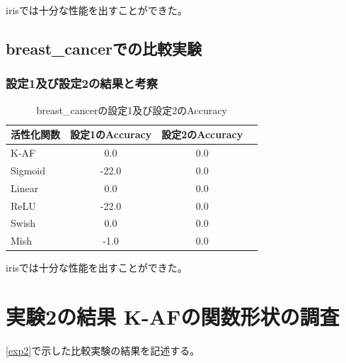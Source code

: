irisでは十分な性能を出すことができた。



\subsection{breast\_cancerでの比較実験}
\label{ev:breastcancer}

\subsubsection{設定1及び設定2の結果と考察}


\begin{table}[htbp]
    \begin{center}
        \caption{breast\_cancerの設定1及び設定2のAccuracy}
        \vspace{2mm} 
        \begin{tabular}{l*{2}{c}r}
            活性化関数              & 設定1のAccuracy &  設定2のAccuracy \\
            \hline
            K-AF            & 0.0 & 0.0 \\
            Sigmoid            & -22.0 & 0.0\\
            Linear            & 0.0 & 0.0\\
            ReLU        & -22.0 & 0.0\\
            Swish           & 0.0 & 0.0 \\
            Mish           & -1.0 & 0.0\\
    
        \end{tabular}
    \end{center}
\end{table}



irisでは十分な性能を出すことができた。




\section{実験2の結果 K-AFの関数形状の調査}
\label{evo2}
\ref{exp2}で示した比較実験の結果を記述する。


